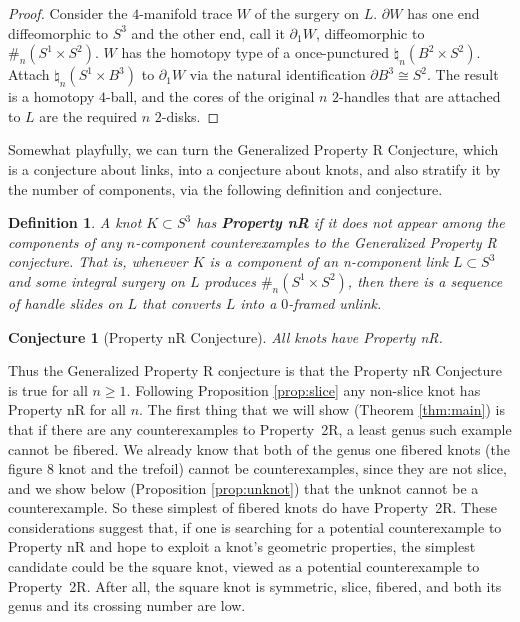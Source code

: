 \documentclass{amsart}
\newtheorem{defin}[thm]{Definition}
\newtheorem{conj}{Conjecture}
\newcommand{\bdd}{\mbox{$\partial$}}
\begin{document}
\begin{proof}  Consider the $4$-manifold trace $W$ of the surgery on $L$.   $\bdd W$ has one end diffeomorphic to $S^3$ and the other end, call it $\bdd_1 W$, diffeomorphic to $\#_{n} (S^{1} \times S^{2})$.  $W$ has the homotopy type of a once-punctured $\natural_{n} (B^{2} \times S^{2})$.  Attach $\natural_{n} (S^{1} \times B^{3})$ to $\bdd_1 W$ via the natural identification $\bdd B^{3} \cong S^2$.  The result is a homotopy $4$-ball, and the cores of the original $n$ $2$-handles that are attached to $L$ are the required $n$ $2$-disks.
\end{proof}

Somewhat playfully, we can turn the Generalized Property R Conjecture, which is a conjecture about links, into a conjecture about knots, and also stratify it by the number of components, via the following definition and conjecture.

\begin{defin} A knot $K \subset S^3$ has {\bf Property nR} if it does not appear among the components of any $n$-component counterexamples to the Generalized Property R conjecture.  That is, whenever $K$ is a component of an n-component link $L \subset S^3$ and some integral surgery on $L$ produces  $\#_{n} (S^{1} \times S^{2})$, then there is a sequence of handle slides on $L$ that converts $L$ into a $0$-framed unlink.
\end{defin}

\begin{conj}[Property nR Conjecture] All knots have Property nR.
\end{conj}

Thus the Generalized Property R conjecture is that the Property nR Conjecture is true for all $n \geq 1$.  Following Proposition \ref{prop:slice} any non-slice knot has Property nR for all $n$.  The first thing that we will show (Theorem \ref{thm:main}) is that if there are any counterexamples to Property~2R, a least genus such example cannot be fibered.  We already know that both of the genus one fibered knots (the figure 8 knot and the trefoil) cannot be counterexamples, since they are not slice, and we show below (Proposition \ref{prop:unknot}) that the unknot cannot be a counterexample. So these simplest of fibered knots do have Property~2R.  These considerations suggest that, if one is searching for a potential counterexample to Property nR and hope to exploit a knot's geometric properties, the simplest candidate could be the square knot, viewed as a potential counterexample to Property~2R.  After all, the square knot is symmetric, slice, fibered, and both its genus and its crossing number are low.
\end{document}
